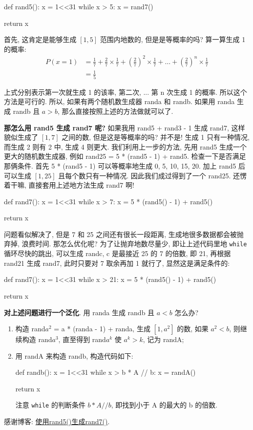 \begin{python}
	def rand5():
		x = 1<<31
		while x > 5:
			x = rand7()
		
		return x
\end{python}

首先, 这肯定是能够生成 $[1, 5]$ 范围内地数的, 但是是等概率的吗? 算一算生成 1 的概率:
$$
\begin{aligned}
	P(x=1) &= \frac{1}{7} + \frac{2}{7} \times \frac{1}{7 } + (\frac{2}{7})^2 \times \frac{1}{7} + \dots + (\frac{2}{7})^n \times \frac{1}{7} \\
		   &= \frac{1}{5}
\end{aligned}
$$

上式分别表示第一次就生成 1 的该率, 第二次, ... 第 n 次生成 1 的概率. 所以这个方法是可行的. 所以, 如果有两个随机数生成器 randa 和 randb. 如果用 randa 生成 randb 且 $a > b$, 那么直接按照上述的方法做就可以了.

\textbf{那怎么用 rand5 生成 rand7 呢?}
如果我用 rand5 + rand3 - 1 生成 rand7, 这样貌似生成了 $[1, 7]$ 之间的数, 但是这是等概率的吗? 并不是! 生成 1 只有一种情况, 而生成 2 则有 2 中, 生成 4 则更大. 我们利用上一步的方法, 先用 rand5 生成一个更大的随机数生成器, 例如 rand25 = 5 * (rand5 - 1) + rand5. 检查一下是否满足那俩条件. 首先 5 * (rand5 - 1) 可以等概率地生成 0, 5, 10, 15, 20. 加上 rand5 后可以生成 $[1, 25]$ 且每个数只有一种情况. 因此我们成过得到了一个 rand25. 还愣着干嘛, 直接套用上述地方法生成 rand7 啊!

\begin{python}
	def rand7():
		x = 1<<31
		while x > 7:
			x = 5 * (rand5() - 1) + rand5()
	
	return x
\end{python}

问题看似解决了, 但是 7 和 25 之间还有很长一段距离, 生成地很多数据都会被抛弃掉, 浪费时间. 那怎么优化呢? 为了让抛弃地数尽量少, 即让上述代码里地 \texttt{while} 循环尽快的跳出, 可以生成 randc, c 是最接近 25 的 7 的倍数, 即 21, 再根据 rand21 生成 rand7, 此时只要对 7 取余再加 1 就行了, 显然这是满足条件的:

\begin{python}
	def rand7():
		x = 1<<31
		while x > 21:
			x = 5 * (rand5() - 1) + rand5()
	
	return x %
\end{python}

\textbf{对上述问题进行一个泛化}. 用 randa 生成 randb 且 $a < b$ 怎么办?
\begin{enumerate}
	\item 构造 rand$a^2$ = a * (randa - 1) + randa, 生成 $[1, a^2]$ 的数, 如果 $a^2 < b$, 则继续构造 rand$a^3$, 直至得到 rand$a^k$ 使 $a^k > k$, 记为 randA;
	
	\item 用 randA 来构造 randb, 构造代码如下:
	  \begin{python}
	  	def randb():
		  	x = 1<<31
		  	while x > b * A // b:
		  		x = randA()
	  	
	  	return x %
	  \end{python}
  	注意 \texttt{while} 的判断条件 $b * A // b$, 即找到小于 A 的最大的 b 的倍数.
\end{enumerate}

感谢博客: \href{https://blog.csdn.net/u010025211/article/details/49668017}{使用rand5()生成rand7()}.